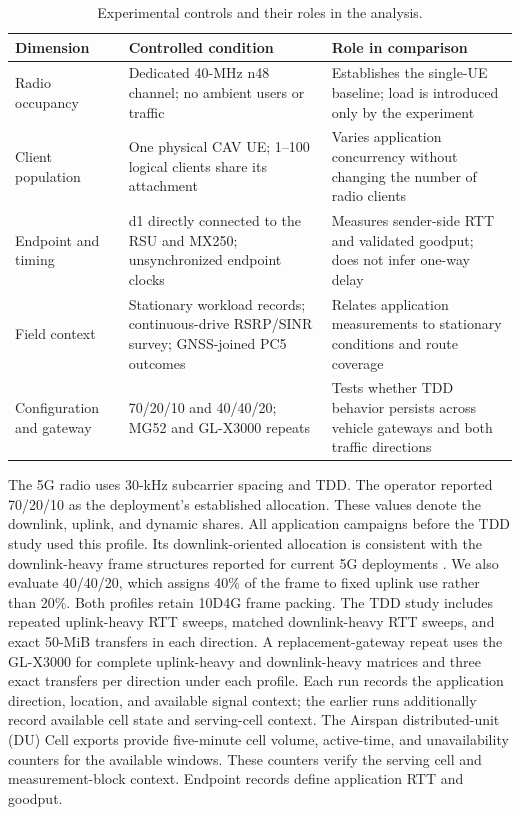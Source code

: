 \begin{table}[t]
  \caption{Experimental controls and their roles in the analysis.}
  \label{tab:deployment}
  \centering
  \footnotesize
  \setlength{\tabcolsep}{4pt}
  \renewcommand{\arraystretch}{1.12}
  \begin{tabular}{@{}C{0.15\textwidth}C{0.36\textwidth}C{0.41\textwidth}@{}}
    \toprule
    Dimension & Controlled condition & Role in comparison \\
    \midrule
    Radio occupancy & Dedicated 40-MHz n48 channel; no ambient users or traffic & Establishes the single-UE baseline; load is introduced only by the experiment \\
    Client population & One physical CAV UE; 1--100 logical clients share its attachment & Varies application concurrency without changing the number of radio clients \\
    Endpoint and timing & d1 directly connected to the RSU and MX250; unsynchronized endpoint clocks & Measures sender-side RTT and validated goodput; does not infer one-way delay \\
    Field context & Stationary workload records; continuous-drive RSRP/SINR survey; GNSS-joined PC5 outcomes & Relates application measurements to stationary conditions and route coverage \\
    Configuration and gateway & 70/20/10 and 40/40/20; MG52 and GL-X3000 repeats & Tests whether TDD behavior persists across vehicle gateways and both traffic directions \\
    \bottomrule
  \end{tabular}
\end{table}

The 5G radio uses 30-kHz subcarrier spacing and TDD. The operator reported
70/20/10 as the deployment's established allocation. These values denote the
downlink, uplink, and dynamic shares. All application campaigns before the TDD
study used this profile. Its downlink-oriented allocation is consistent with
the downlink-heavy frame structures reported for current 5G deployments
\cite{ngmn2021tdd}. We also evaluate 40/40/20, which assigns 40\% of the frame
to fixed uplink use rather than 20\%. Both profiles retain 10D4G frame packing.
The TDD study includes repeated uplink-heavy RTT sweeps, matched downlink-heavy
RTT sweeps, and exact 50-MiB transfers in each direction. A replacement-gateway
repeat uses the GL-X3000 for complete uplink-heavy and downlink-heavy matrices
and three exact transfers per direction under each profile. Each run
records the application direction, location, and available signal context;
the earlier runs additionally record available cell state and serving-cell
context.
The Airspan distributed-unit (DU) Cell exports provide five-minute cell volume,
active-time, and unavailability counters for the available windows. These
counters verify the serving cell and measurement-block context. Endpoint
records define application RTT and goodput.

